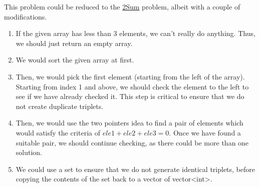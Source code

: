 \documentclass[11pt]{article}
\begin{document}
This problem could be reduced to the \href{https://leetcode.com/problems/two-sum/}{2Sum}
problem, albeit with a couple of modifications.
\begin{enumerate}
 \item{
             If the given array has less than 3 elements, we can't really do anything. Thus, we should just return an empty array.
             
       }
 \item{
             We would sort the given array at first.
       }
 \item{
             Then, we would pick the first element (starting from the left of the array).
             Starting from index 1 and above, we should check the element to the left to see if we have already checked it. This step is critical to ensure that we do not create duplicate triplets.
       }
 \item {
       Then, we would use the two pointers idea to find a pair of elements which would satisfy the criteria of $ele1+ele2+ele3=0$. Once we have found a suitable pair, we should continue checking, as there could be more than one solution.
       
       }
       \item{
                   We could use a set to ensure that we do not generate identical triplets, before copying the contents of the set back to a vector of vector<int>.
             }
\end{enumerate}
\end{document}
